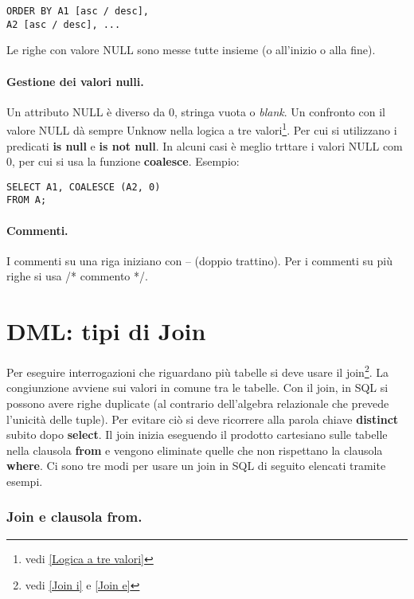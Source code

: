 \begin{lstlisting}[style=SQL, caption=Ordinare i risultati in una query]
ORDER BY A1 [asc / desc], 
A2 [asc / desc], ...
\end{lstlisting}

Le righe con valore NULL sono messe tutte insieme (o all'inizio o alla fine).

\paragraph{Gestione dei valori nulli.} Un attributo NULL è diverso da 0, stringa vuota o \textit{blank}. Un confronto con il valore NULL dà sempre Unknow nella logica a tre valori\footnote{vedi \ref{Logica a tre valori}}. Per cui si utilizzano i predicati \textbf{is null} e \textbf{is not null}. In alcuni casi è meglio trttare i valori NULL com 0, per cui si usa la funzione \textbf{coalesce}. Esempio:

\begin{lstlisting}[style=SQL, caption=I valori nulli]
SELECT A1, COALESCE (A2, 0)
FROM A;
\end{lstlisting}

\paragraph{Commenti.} I commenti su una riga iniziano con -- (doppio trattino). Per i commenti su più righe si usa /* commento */.

\section{DML: tipi di Join} 

Per eseguire interrogazioni che riguardano più tabelle si deve usare il join\footnote{vedi \ref{Join i} e \ref{Join e}}. La congiunzione avviene sui valori in comune tra le tabelle. Con il join, in SQL si possono avere righe duplicate (al contrario dell'algebra relazionale che prevede l'unicità delle tuple). Per evitare ciò si deve ricorrere alla parola chiave \textbf{distinct} subito dopo \textbf{select}. 
Il join inizia eseguendo il prodotto cartesiano sulle tabelle nella clausola \textbf{from} e vengono eliminate quelle che non rispettano la clausola \textbf{where}.
Ci sono tre modi per usare un join in SQL di seguito elencati tramite esempi.

\subsubsection{Join e clausola from.}

